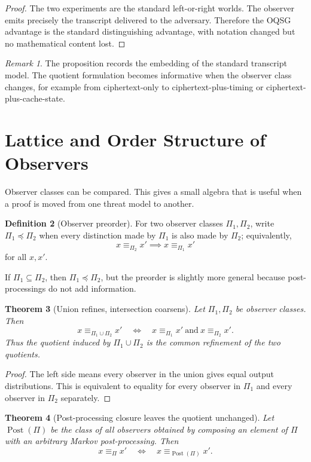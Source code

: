 \documentclass[11pt]{article}
\theoremstyle{definition}
\newtheorem{definition}{Definition}[section]
\theoremstyle{plain}
\newtheorem{theorem}[definition]{Theorem}
\theoremstyle{remark}
\newtheorem{remark}[definition]{Remark}
\begin{document}
\begin{proof}
The two experiments are the standard left-or-right worlds. The observer emits precisely the transcript delivered to the adversary. Therefore the OQSG advantage is the standard distinguishing advantage, with notation changed but no mathematical content lost.
\end{proof}

\begin{remark}
The proposition records the embedding of the standard transcript model. The quotient formulation becomes informative when the observer class changes, for example from ciphertext-only to ciphertext-plus-timing or ciphertext-plus-cache-state.
\end{remark}

\section{Lattice and Order Structure of Observers}

Observer classes can be compared. This gives a small algebra that is useful when a proof is moved from one threat model to another.

\begin{definition}[Observer preorder]
For two observer classes $\Pi_1,\Pi_2$, write $\Pi_1\preceq \Pi_2$ when every distinction made by $\Pi_1$ is also made by $\Pi_2$; equivalently,
\[
    x\equiv_{\Pi_2}x' \implies x\equiv_{\Pi_1}x'
\]
for all $x,x'$.
\end{definition}

If $\Pi_1\subseteq\Pi_2$, then $\Pi_1\preceq\Pi_2$, but the preorder is slightly more general because post-processings do not add information.

\begin{theorem}[Union refines, intersection coarsens]
Let $\Pi_1,\Pi_2$ be observer classes. Then
\[
    x\equiv_{\Pi_1\cup\Pi_2}x'
    \quad\Longleftrightarrow\quad
    x\equiv_{\Pi_1}x'\ \text{and}\ x\equiv_{\Pi_2}x'.
\]
Thus the quotient induced by $\Pi_1\cup\Pi_2$ is the common refinement of the two quotients.
\end{theorem}

\begin{proof}
The left side means every observer in the union gives equal output distributions. This is equivalent to equality for every observer in $\Pi_1$ and every observer in $\Pi_2$ separately.
\end{proof}

\begin{theorem}[Post-processing closure leaves the quotient unchanged]
Let $\operatorname{Post}(\Pi)$ be the class of all observers obtained by composing an element of $\Pi$ with an arbitrary Markov post-processing. Then
\[
    x\equiv_{\Pi}x'\quad\Longleftrightarrow\quad x\equiv_{\operatorname{Post}(\Pi)}x'.
\]
\end{theorem}
\end{document}
